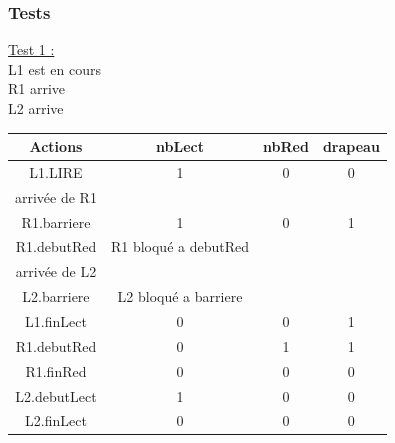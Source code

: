 \documentclass[11pt,a4paper]{article}
\begin{document}
\subsubsection{Tests}
\underline{Test 1 :} \\
L1 est en cours\\
\indent R1 arrive \\
\indent L2 arrive\\
\begin{center}
    
    \begin{tabular}{|c|c|c|c|}
        \hline 
        \rule[-1ex]{0pt}{2.5ex} \textbf{Actions} & \textbf{nbLect}       & \textbf{nbRed} & \textbf{drapeau} \\ 
        \hline 
        \rule[-1ex]{0pt}{2.5ex} L1.LIRE          & 1                     & 0              & 0                \\ 
        \hline 
        \rule[-1ex]{0pt}{2.5ex} arrivée de R1   &                       &                &                  \\ 
        \hline 
        \rule[-1ex]{0pt}{2.5ex} R1.barriere      & 1                     & 0              & 1                \\ 
        \hline 
        \rule[-1ex]{0pt}{2.5ex} R1.debutRed      & R1 bloqué a debutRed &                &                  \\ 
        \hline 
        \rule[-1ex]{0pt}{2.5ex} arrivée de L2   &                       &                &                  \\ 
        \hline 
        \rule[-1ex]{0pt}{2.5ex} L2.barriere      & L2 bloqué a barriere &                &                  \\ 
        \hline 
        \rule[-1ex]{0pt}{2.5ex} L1.finLect       & 0                     & 0              & 1                \\ 
        \hline 
        \rule[-1ex]{0pt}{2.5ex} R1.debutRed      & 0                     & 1              & 1                \\ 
        \hline 
        \rule[-1ex]{0pt}{2.5ex} R1.finRed        & 0                     & 0              & 0                \\ 
        \hline 
        \rule[-1ex]{0pt}{2.5ex} L2.debutLect     & 1                     & 0              & 0                \\ 
        \hline 
        \rule[-1ex]{0pt}{2.5ex} L2.finLect       & 0                     & 0              & 0                \\ 
        \hline 
    \end{tabular} 
\end{center}
\newpage
\end{document}
